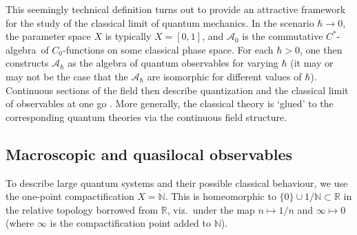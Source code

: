 \documentclass[12pt]{article}
\newcommand{\ca}{$C^*$-algebra} \newcommand{\jba}{JB-algebra}
\newcommand{\raw}{\rightarrow} \newcommand{\rat}{\mapsto}
\newcommand{\CA}{{\mathcal A}} \newcommand{\CB}{{\mathcal B}}
\newcommand{\N}{{\mathbb N}} \newcommand{\R}{{\mathbb R}}
\begin{document}
This seemingly technical definition turns out to provide an attractive framework for the study of the classical limit of quantum mechanics. In the scenario $\hbar\raw 0$, the parameter space $X$ is typically $X=[0,1]$, and $\CA_0$ is the commutative \ca\ of $C_0$-functions on some classical phase space. For each $\hbar>0$, one then constructs $\CA_{\hbar}$ as the algebra of quantum observables for varying $\hbar$ (it may or may not be the case that the $\CA_{\hbar}$ are isomorphic for different values of $\hbar$). Continuous sections of the field then describe quantization and the classical limit of observables at one go \cite{book}. More generally, the classical theory is `glued' to the corresponding quantum theories via the continuous field structure. 
 \subsection{Macroscopic and quasilocal observables}\label{MO}
To describe large quantum systems and their possible classical behaviour, we use
the one-point compactification $X=\dot{\N}$. This is homeomorphic to 
 $\{0\}\cup 1/\N\subset \R$ in the relative topology borrowed from $\R$, viz.\ 
under the map $n\mapsto 1/n$ and $\infty\mapsto 0$ (where $\infty$ is the compactification point added to $\N$).
\end{document}
